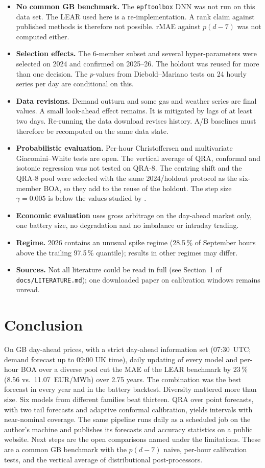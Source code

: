 \documentclass[11pt,a4paper]{article}
\begin{document}
\begin{itemize}
\item \textbf{No common GB benchmark.} The \texttt{epftoolbox} DNN was not run on this data set. The LEAR used here is a re-implementation. A rank claim against published methods is therefore not possible. rMAE against $p(d\!-\!7)$ was not computed either.
\item \textbf{Selection effects.} The 6-member subset and several hyper-parameters were selected on 2024 and confirmed on 2025--26. The holdout was reused for more than one decision. The $p$-values from Diebold--Mariano tests on 24 hourly series per day are conditional on this.
\item \textbf{Data revisions.} Demand outturn and some gas and weather series are final values. A small look-ahead effect remains. It is mitigated by lags of at least two days. Re-running the data download revises history. A/B baselines must therefore be recomputed on the same data state.
\item \textbf{Probabilistic evaluation.} Per-hour Christoffersen and multivariate Giacomini--White tests are open. The vertical average of QRA, conformal and isotonic regression \citep{lipiecki2024} was not tested on QRA-8. The centring shift and the QRA-8 pool were selected with the same 2024/holdout protocol as the six-member BOA, so they add to the reuse of the holdout. The step size $\gamma=0.005$ is below the values studied by \citet{zaffran2022}.
\item \textbf{Economic evaluation} uses gross arbitrage on the day-ahead market only, one battery size, no degradation and no imbalance or intraday trading.
\item \textbf{Regime.} 2026 contains an unusual spike regime (28.5\,\% of September hours above the trailing 97.5\,\% quantile); results in other regimes may differ.
\item \textbf{Sources.} Not all literature could be read in full (see Section~1 of \texttt{docs/LITERATURE.md}); one downloaded paper on calibration windows remains unread.
\end{itemize}

\section{Conclusion}

On GB day-ahead prices, with a strict day-ahead information set (07:30~UTC; demand forecast up to 09:00 UK time), daily updating of every model and per-hour BOA over a diverse pool cut the MAE of the LEAR benchmark by 23\,\% (8.56 vs.\ 11.07~EUR/MWh) over 2.75 years. The combination was the best forecast in every year and in the battery backtest. Diversity mattered more than size. Six models from different families beat thirteen. QRA over point forecasts, with two tail forecasts and adaptive conformal calibration, yields intervals with near-nominal coverage. The same pipeline runs daily as a scheduled job on the author's machine and publishes its forecasts and accuracy statistics on a public website. Next steps are the open comparisons named under the limitations. These are a common GB benchmark with the $p(d\!-\!7)$ naive, per-hour calibration tests, and the vertical average of distributional post-processors.
\end{document}

